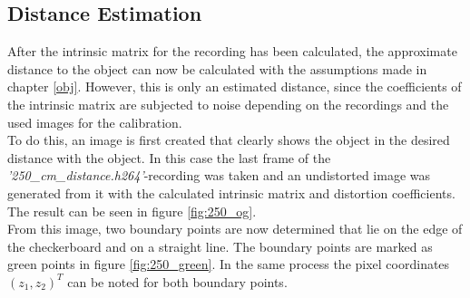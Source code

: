\subsection{Distance Estimation}

After the intrinsic matrix for the recording has been calculated, the approximate distance to the object can now be calculated with the assumptions made in chapter \ref{obj}. However, this is only an estimated distance, since the coefficients of the intrinsic matrix are subjected to noise depending on the recordings and the used images for the calibration.\\

To do this, an image is first created that clearly shows the object in the desired distance with the object. In this case the last frame of the \textit{'250\_cm\_distance.h264’}-recording was taken and an undistorted image was generated from it with the calculated intrinsic matrix and distortion coefficients. The result can be seen in figure \ref{fig:250_og}.\\

From this image, two boundary points are now determined that lie on the edge of the checkerboard and on a straight line. The boundary points are marked as green points in figure \ref{fig:250_green}. In the same process the pixel coordinates $(z_1, z_2)^{T}$ can be noted for both boundary points.\\

